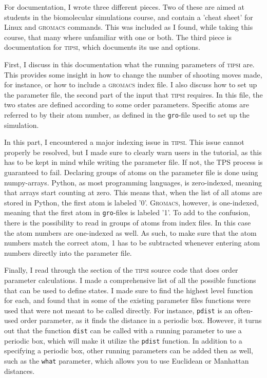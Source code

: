\documentclass[]{article}
\begin{document}
For documentation, I wrote three different pieces. Two of these are aimed at students in the biomolecular simulations course, and contain a 'cheat sheet' for Linux and \textsc{gromacs} commands. This was included as I found, while taking this course, that many where unfamiliar with one or both. The third piece is documentation for \textsc{tipsi}, which documents its use and options.

First, I discuss in this documentation what the running parameters of \textsc{tipsi} are. This provides some insight in how to change the number of shooting moves made, for instance, or how to include a \textsc{gromacs} index file. I also discuss how to set up the parameter file, the second part of the input that \textsc{tipsi} requires. In this file, the two states are defined according to some order parameters. Specific atoms are referred to by their atom number, as defined in the \texttt{gro}-file used to set up the simulation.

In this part, I encountered a major indexing issue in \textsc{tipsi}. This issue cannot properly be resolved, but I made sure to clearly warn users in the tutorial, as this has to be kept in mind while writing the parameter file. If not, the TPS process is guaranteed to fail. Declaring groups of atoms on the parameter file is done using numpy-arrays.  Python, as most programming languages, is zero-indexed, meaning that arrays start counting at zero. This means that, when the list of all atoms are stored in Python, the first atom is labeled '0'. \textsc{Gromacs}, however, is one-indexed, meaning that the first atom in \texttt{gro}-files is labeled '1'. To add to the confusion, there is the possibility to read in groups of atoms from index files. In this case the atom numbers are one-indexed as well. As such, to make sure that the atom numbers match the correct atom, 1 has to be subtracted whenever entering atom numbers directly into the parameter file.

Finally, I read through the section of the \textsc{tipsi} source code that does order parameter calculations. I made a comprehensive list of all the possible functions that can be used to define states. I made sure to find the highest level function for each, and found that in some of the existing parameter files functions were used that were not meant to be called directly. For instance, \texttt{pdist} is an often-used order parameter, as it finds the distance in a periodic box. However, it turns out that the function \texttt{dist} can be called with a running parameter to use a periodic box, which will make it utilize the \texttt{pdist} function. In addition to a specifying a periodic box, other running parameters can be added then as well, such as the \texttt{what} parameter, which allows you to use Euclidean or Manhattan distances.
\end{document}
